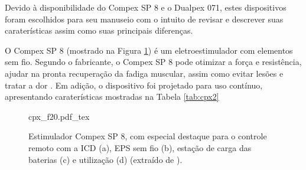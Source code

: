 Devido à disponibilidade do Compex SP 8 e o Dualpex 071, estes dispositivos foram escolhidos para seu manuseio com o intuito de revisar e descrever suas caraterísticas assim como suas principais diferenças.

O Compex SP 8 (mostrado na Figura \ref{fig:cpx_f20}) é um eletroestimulador com elementos sem fio. Segundo o fabricante, o Compex SP 8 pode otimizar a força e resistência, ajudar na pronta recuperação da fadiga muscular, assim como evitar lesões e tratar a dor \cite{R2012a}. Em adição, o dispositivo foi projetado para uso contínuo, apresentando caraterísticas mostradas na Tabela \ref{tab:cpx2} %

\begin{figure}[h]
    \centering %
    \small %
    \def\svgwidth{1
    \columnwidth}%
    {cpx_f20.pdf_tex}
    \caption{Estimulador Compex SP 8, com especial destaque para o controle remoto com a ICD (a), EPS sem fio (b), estação de carga das baterias (c) e utilização (d) (extraído de \cite{R2012a}).}
    \label{fig:cpx_f20}
\end{figure}

